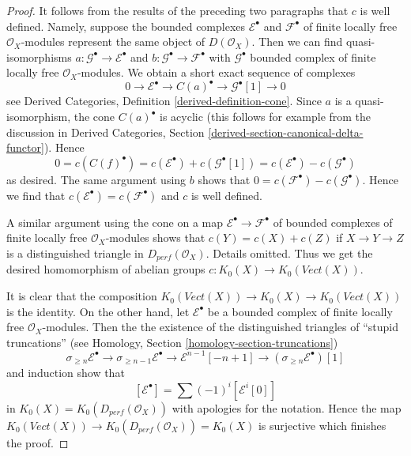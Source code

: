 \begin{proof}
\medskip\noindent
It follows from the results of the preceding two paragraphs that $c$
is well defined. Namely, suppose the bounded complexes
$\mathcal{E}^\bullet$ and $\mathcal{F}^\bullet$ of finite locally free
$\mathcal{O}_X$-modules represent the same object of $D(\mathcal{O}_X)$.
Then we can find quasi-isomorphisms
$a : \mathcal{G}^\bullet \to \mathcal{E}^\bullet$ and
$b : \mathcal{G}^\bullet \to \mathcal{F}^\bullet$
with $\mathcal{G}^\bullet$ bounded complex of finite locally free
$\mathcal{O}_X$-modules.
We obtain a short exact sequence of complexes
$$
0 \to \mathcal{E}^\bullet \to C(a)^\bullet \to \mathcal{G}^\bullet[1] \to 0
$$
see Derived Categories, Definition \ref{derived-definition-cone}.
Since $a$ is a quasi-isomorphism, the cone $C(a)^\bullet$ is
acyclic (this follows for example from the discussion in
Derived Categories, Section \ref{derived-section-canonical-delta-functor}).
Hence
$$
0 = c(C(f)^\bullet) = c(\mathcal{E}^\bullet) + c(\mathcal{G}^\bullet[1]) =
c(\mathcal{E}^\bullet) - c(\mathcal{G}^\bullet)
$$
as desired. The same argument using $b$ shows that
$0 = c(\mathcal{F}^\bullet) - c(\mathcal{G}^\bullet)$.
Hence we find that $c(\mathcal{E}^\bullet) = c(\mathcal{F}^\bullet)$
and $c$ is well defined.

\medskip\noindent
A similar argument using the cone on a map
$\mathcal{E}^\bullet \to \mathcal{F}^\bullet$
of bounded complexes of finite locally free $\mathcal{O}_X$-modules
shows that $c(Y) = c(X) + c(Z)$ if $X \to Y \to Z$ is a distinguished triangle
in $D_{perf}(\mathcal{O}_X)$. Details omitted.
Thus we get the desired homomorphism
of abelian groups $c : K_0(X) \to K_0(\textit{Vect}(X))$.

\medskip\noindent
It is clear that the composition
$K_0(\textit{Vect}(X)) \to K_0(X) \to K_0(\textit{Vect}(X))$
is the identity. On the other hand, let $\mathcal{E}^\bullet$
be a bounded complex of finite locally free $\mathcal{O}_X$-modules.
Then the the existence of the distinguished triangles
of ``stupid truncations''
(see Homology, Section \ref{homology-section-truncations})
$$
\sigma_{\geq n}\mathcal{E}^\bullet \to
\sigma_{\geq n - 1}\mathcal{E}^\bullet \to
\mathcal{E}^{n - 1}[-n + 1] \to
(\sigma_{\geq n}\mathcal{E}^\bullet)[1]
$$
and induction show that
$$
[\mathcal{E}^\bullet] = \sum (-1)^i[\mathcal{E}^i[0]]
$$
in $K_0(X) = K_0(D_{perf}(\mathcal{O}_X))$ with apologies for the notation.
Hence the map $K_0(\textit{Vect}(X)) \to K_0(D_{perf}(\mathcal{O}_X)) = K_0(X)$
is surjective which finishes the proof.
\end{proof}

